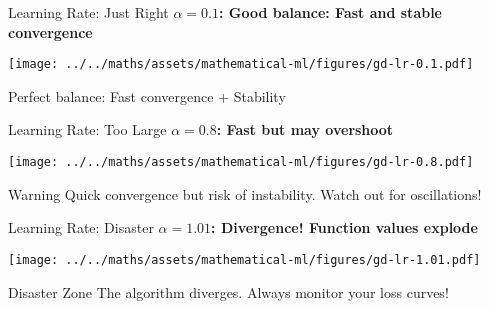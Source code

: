 \documentclass[usenames,dvipsnames]{beamer}
\begin{document}
  \begin{frame}{Learning Rate: Just Right}
    \textbf{$\alpha = 0.1$: Good balance: Fast and stable convergence}
    \begin{center}
    \texttt{[image: ../../maths/assets/mathematical-ml/figures/gd-lr-0.1.pdf]}
    \end{center}
    
    \begin{keypointsbox}{}
    Perfect balance: Fast convergence + Stability
    \end{keypointsbox}
  \end{frame}

  \begin{frame}{Learning Rate: Too Large}
    \textbf{$\alpha = 0.8$: Fast but may overshoot}
    \begin{center}
    \texttt{[image: ../../maths/assets/mathematical-ml/figures/gd-lr-0.8.pdf]}
    \end{center}
    
    \begin{alertbox}{Warning}
    Quick convergence but risk of instability. Watch out for oscillations!
    \end{alertbox}
  \end{frame}

  \begin{frame}{Learning Rate: Disaster}
    \textbf{$\alpha = 1.01$: Divergence! Function values explode}
    \begin{center}
    \texttt{[image: ../../maths/assets/mathematical-ml/figures/gd-lr-1.01.pdf]}
    \end{center}
    
    \begin{alertbox}{Disaster Zone}
    The algorithm diverges. Always monitor your loss curves!
    \end{alertbox}
  \end{frame}
\end{document}
